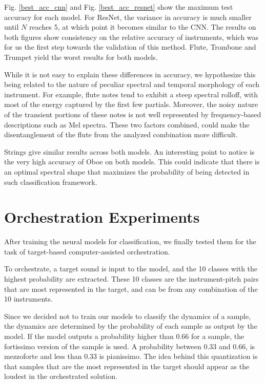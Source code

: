 \documentclass[runningheads,a4paper]{llncs}
\begin{document}
  
Fig. \ref{best_acc_cnn} and Fig. \ref{best_acc_resnet} show the maximum test accuracy for each model. For ResNet, the variance in accuracy is much smaller until $N$ reaches 5, at which point it becomes similar to the CNN. The results on both figures show consistency on the relative accuracy of instruments, which was for us the first step towards the validation of this method. Flute, Trombone and Trumpet yield the worst results for both models. 

While it is not easy to explain these differences in accuracy, we hypothesize this being related to the nature of peculiar spectral and temporal morphology of each instrument. For example, flute notes tend to exhibit a steep spectral rolloff, with most of the energy captured by the first few partials. Moreover, the noisy nature of the transient portions of these notes is not well represented by frequency-based descriptions such as Mel spectra. These two factors combined, could make the disentanglement of the flute from the analyzed combination more difficult.

Strings give similar results across both models. An interesting point to notice is the very high accuracy of Oboe on both models. This could indicate that there is an optimal spectral shape that maximizes the probability of being detected in such classification framework.


\section{Orchestration Experiments}
\label{sec:orchestration}

After training the neural models for classification, we finally tested them for the task of target-based computer-assisted orchestration. 

To orchestrate, a target sound is input to the model, and the 10 classes with the highest probability are extracted. These 10 classes are the instrument-pitch pairs that are most represented in the target, and can be from any combination of the 10 instruments. 

Since we decided not to train our models to classify the dynamics of a sample, the dynamics are determined by the probability of each sample as output by the model. If the model outputs a probability higher than $0.66$ for a sample, the fortissimo version of the sample is used. A probability between $0.33$ and $0.66$, is mezzoforte and less than $0.33$ is pianissimo. The idea behind this quantization is that samples that are the most represented in the target should appear as the loudest in the orchestrated solution.
\end{document}
